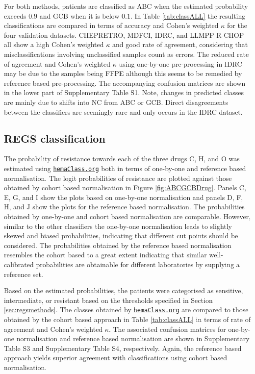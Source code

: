 \documentclass[twocolumn]{bmcart}%
\newcommand{\hemaClass}{\href{http://hemaClass.org}{\texttt{hemaClass.org}}}
\begin{document}
For both methods, patients are classified as ABC when the estimated probability exceeds $0.9$ and GCB when it is below $0.1$.
In Table \ref{tab:classALL} the resulting classifications are compared in terms of accuracy and Cohen's weighted $\kappa$ for the four validation datasets.
CHEPRETRO, MDFCI, IDRC, and LLMPP R-CHOP all show a high Cohen's weighted $\kappa$ and good rate of agreement, considering that misclassifications involving unclassified samples count as errors.
The reduced rate of agreement and Cohen's weighted $\kappa$ using one-by-one pre-processing in IDRC may be due to the samples being FFPE although this seems to be remedied by reference based pre-processing.
The accompanying confusion matrices are shown in the lower part of Supplementary Table S1.%
Note, changes in predicted classes are mainly due to shifts into NC from ABC or GCB.
Direct disagreements between the classifiers are seemingly rare and only occurs in the IDRC dataset.




\subsection{REGS classification}
The probability of resistance towards each of the three drugs C, H, and O was estimated using \hemaClass{} both in terms of one-by-one and reference based normalisation.
The logit probabilities of resistance are plotted against those obtained by cohort based normalisation in Figure \ref{fig:ABCGCBDrug}.
Panels C, E, G, and I show the plots based on one-by-one normalisation and panels D, F, H, and J show the plots for the reference based normalisation.
The probabilities obtained by one-by-one and cohort based normalisation are comparable. However, similar to the other classifiers the one-by-one normalisation leads to slightly skewed and biased probabilities, indicating that different cut points should be considered.
The probabilities obtained by the reference based normalisation resembles the cohort based to a great extent indicating that similar well-calibrated probabilities are obtainable for different laboratories by supplying a reference set.

Based on the estimated probabilities, the patients were categorised as sensitive, intermediate, or resistant based on the thresholds specified in Section \ref{sec:regsmethods}.
The classes obtained by \hemaClass{} are compared to those obtained by the cohort based approach in Table \ref{tab:classALL} in terms of rate of agreement and Cohen's weighted $\kappa$.
The associated confusion matrices for one-by-one normalisation and reference based normalisation are shown in Supplementary Table S3 %
and Supplementary Table S4, %
respectively.
Again, the reference based approach yields superior agreement with classifications using cohort based normalisation.
\end{document}
